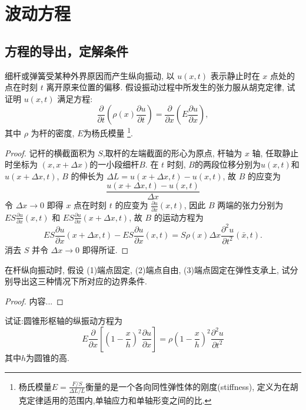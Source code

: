 \chapter{波动方程}

\section{方程的导出，定解条件}


\begin{exercise}
  细杆或弹簧受某种外界原因而产生纵向振动, 
  以 $u(x,t)$ 表示静止时在 $x$ 点处的点在时刻 $t$ 离开原来位置的偏移.
  假设振动过程中所发生的张力服从胡克定律, 试证明 $u(x,t)$ 满足方程:
  \[\frac{\partial}{\partial t}\left(\rho(x)\frac{\partial u}{\partial t}\right)
    = \frac{\partial}{\partial x}\left(E\frac{\partial u}{\partial x}\right),\]
  其中 $\rho$ 为杆的密度, $E$为杨氏模量%
  \footnote{杨氏模量$E=\frac{F/S}{\Delta L/L}$衡量的是一个各向同性弹性体的刚度(stiffness),
    定义为在胡克定律适用的范围内,单轴应力和单轴形变之间的比.}.
\end{exercise}

\begin{proof}
  记杆的横截面积为 $S$,取杆的左端截面的形心为原点, 杆轴为 $x$ 轴,
  任取静止时坐标为 $(x,x+\Delta x)$的一小段细杆$B$.
  在 $t$ 时刻, $B$的两段位移分别为$u(x,t)$和$u(x+\Delta x,t)$,
  $B$ 的伸长为 $\Delta L=u(x+\Delta x,t)-u(x,t)$, 故 $B$ 的应变为
  \[\frac{u(x+\Delta x,t)-u(x,t)}{\Delta x}\]
  令 $\Delta x\to 0$ 即得 $x$ 点在时刻 $t$ 的应变为 $\frac{\partial u}{\partial x}(x,t)$,
  因此 $B$ 两端的张力分别为 $ES\frac{\partial u}{\partial x}(x,t)$
  和 $ES\frac{\partial u}{\partial x}(x+\Delta x,t)$, 故 $B$ 的运动方程为
  \[ES\frac{\partial u}{\partial x}(x+\Delta x,t)-ES\frac{\partial u}{\partial x}(x,t)
    = S\rho(x)\Delta x\frac{\partial^2u}{\partial t^2}(\bar{x},t).\]
  消去 $S$ 并令 $\Delta x\to 0$ 即得所证.
\end{proof}


\begin{exercise}
  在杆纵向振动时, 假设 (1)端点固定, (2)端点自由, (3)端点固定在弹性支承上,
  试分别导出这三种情况下所对应的边界条件.
\end{exercise}

\begin{proof}
	内容...
\end{proof}


\begin{exercise}
  试证:圆锥形枢轴的纵振动方程为
  \[E\frac{\partial}{\partial x}\left[\left(1-\frac{x}{h}\right)^2\frac{\partial u}{\partial x}\right]=\rho\left(1-\frac{x}{h}\right)^2\frac{\partial^2u}{\partial t^2}\]
  其中$h$为圆锥的高.
\end{exercise}


